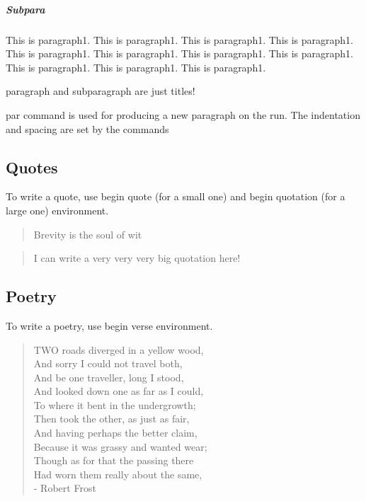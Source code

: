 \documentclass[10pt,a4paper]{article}
\begin{document}
\subparagraph{Subpara}This is paragraph1. This is paragraph1. This is paragraph1. This is paragraph1. This is paragraph1. This is paragraph1. This is paragraph1. This is paragraph1. This is paragraph1. This is paragraph1. This is paragraph1.

paragraph and subparagraph are just titles!

par command is used for producing a new paragraph on the run. The indentation and spacing are set by the commands

\subsection{Quotes}

To write a quote, use begin quote (for a small one) and begin quotation (for a large one) environment.

\begin{quote}
Brevity is the soul of wit
\end{quote}

\begin{quotation}
I can write a very very very big quotation here!
\end{quotation}

\subsection{Poetry}

To write a poetry, use begin verse environment.

\begin{verse}
TWO roads diverged in a yellow wood,\\	
And sorry I could not travel both,\\	
And be one traveller, long I stood,\\	
And looked down one as far as I could,\\	
To where it bent in the undergrowth;\\
 
Then took the other, as just as fair,\\	
And having perhaps the better claim,\\	
Because it was grassy and wanted wear;\\	
Though as for that the passing there\\	
Had worn them really about the same,\\

\hfill - Robert Frost
\end{verse}
\end{document}
